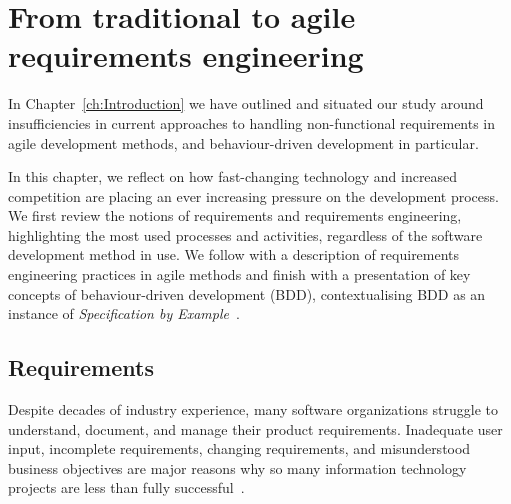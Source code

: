 \documentclass[dissertation,final]{softeng}
\begin{document}
\chapter{From traditional to agile requirements engineering}
\label{ch:Background}
In Chapter~\ref{ch:Introduction} we have outlined and situated our study around insufficiencies in current approaches to handling non-functional requirements in agile development methods, and behaviour-driven development in particular. 

In this chapter, we reflect on how fast-changing technology and increased competition are placing an ever increasing pressure on the development process. We first review the notions of requirements and requirements engineering, highlighting the most used processes and activities, regardless of the software development method in use. We follow with a description of requirements engineering practices in agile methods and finish with a presentation of key concepts of behaviour-driven development (BDD), contextualising BDD as an instance of \emph{Specification by Example}~\citep{Adzic201106}.

\section{Requirements}
\label{sec:requirements}
Despite decades of industry experience, many software organizations struggle to understand, document, and manage their product requirements. Inadequate user input, incomplete requirements, changing requirements, and misunderstood business objectives are major reasons why so many information technology projects are less than fully successful~\citep{Wiegers2013}. 
\end{document}
